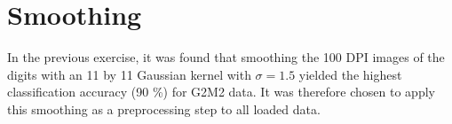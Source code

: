 \section{Smoothing}
\label{sec:smoothing}
In the previous exercise,
it was found that smoothing the 100 DPI images of the digits
with an 11 by 11 Gaussian kernel with \(\sigma=1.5\)
yielded the highest classification accuracy (90 \%) for G2M2 data.
It was therefore chosen to apply this smoothing as a preprocessing
step to all loaded data.
